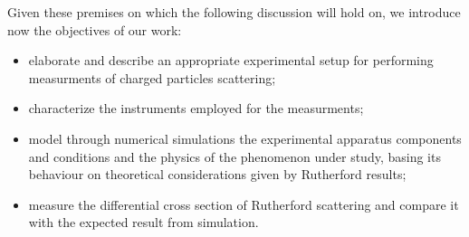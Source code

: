 \documentclass[../../main/main.tex]{subfiles}
\begin{document}
Given these premises on which the following discussion will hold on, we introduce now the objectives of our work:
\begin{itemize}
    \item elaborate and describe an appropriate experimental setup for performing measurments of charged particles scattering;
    \item characterize the instruments employed for the measurments;
    \item model through numerical simulations the experimental apparatus components and conditions and the physics of the phenomenon under study, basing its behaviour on theoretical considerations given by Rutherford results;
    \item measure the differential cross section of Rutherford scattering and compare it with the expected result from simulation.
\end{itemize}
\end{document}

